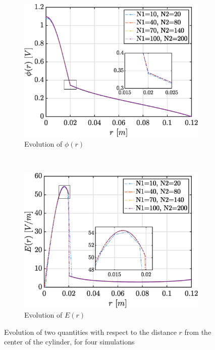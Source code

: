 \documentclass[a4paper,12pt,twoside]{article}
\newcommand{\bracket}[1]{\left(#1\right)}
\begin{document}
  \begin{figure}[h]
    \centering
    \begin{subfigure}{0.45\textwidth}
      \includegraphics[width=\textwidth]{graphs/exd1-evoPhi}
      \caption{Evolution of $\phi\bracket{r}$}
      \label{fig:d1-evoPhi}
    \end{subfigure}
    ~
    \begin{subfigure}{0.45\textwidth}
      \includegraphics[width=\textwidth]{graphs/exd1-evoEr}
      \caption{Evolution of $E(r)$}
      \label{fig:d1-evoEr}
    \end{subfigure}
    \caption{Evolution of two quantities with respect to the distance $r$ from the center of the cylinder, for four simulations}
    \label{fig:d1-evo}
  \end{figure}
\end{document}
